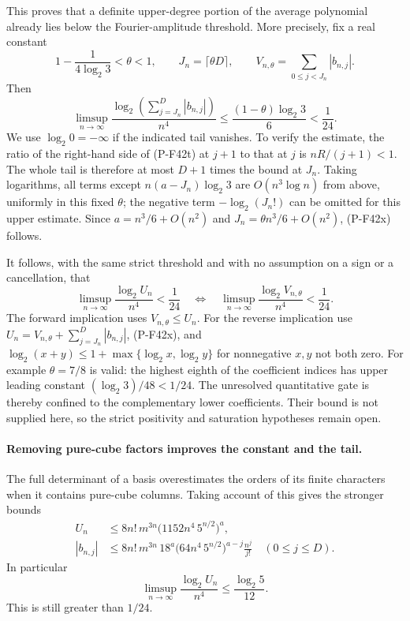This proves that a definite upper-degree portion of the
average polynomial already lies below the Fourier-amplitude
threshold. More precisely, fix a real constant
\[
 1-\frac1{4\log_2 3}<\theta<1,
 \qquad J_n=\lceil\theta D\rceil,
 \qquad V_{n,\theta}=\sum_{0\le j<J_n}|b_{n,j}|.
 \tag{P-F42w}
\]
Then
\[
 \limsup_{n\to\infty}
 \frac{\log_2\left(\sum_{j=J_n}^{D}|b_{n,j}|\right)}{n^4}
 \le \frac{(1-\theta)\log_2 3}{6}<\frac1{24}.
 \tag{P-F42x}
\]
We use \(\log_2 0=-\infty\) if the indicated tail vanishes.
To verify the estimate, the ratio of the right-hand side
of (P-F42t) at \(j+1\) to that at \(j\) is
\(nR/(j+1)<1\).
The whole tail is therefore at most \(D+1\) times
the bound at \(J_n\). Taking logarithms,
all terms except \(n(a-J_n)\log_2 3\) are
\(O(n^3\log n)\) from above, uniformly in this fixed
\(\theta\); the negative term \(-\log_2(J_n!)\)
can be omitted for this upper estimate.
Since \(a=n^3/6+O(n^2)\) and
\(J_n=\theta n^3/6+O(n^2)\), (P-F42x) follows.

It follows, with the same strict threshold and with no
assumption on a sign or a cancellation, that
\[
 \limsup_{n\to\infty}\frac{\log_2 U_n}{n^4}<\frac1{24}
 \quad\Longleftrightarrow\quad
 \limsup_{n\to\infty}
        \frac{\log_2 V_{n,\theta}}{n^4}<\frac1{24}.
 \tag{P-F42y}
\]
The forward implication uses \(V_{n,\theta}\le U_n\).
For the reverse implication use
\(U_n=V_{n,\theta}+\sum_{j=J_n}^D|b_{n,j}|\),
(P-F42x), and
\(\log_2(x+y)\le1+\max\{\log_2x,\log_2y\}\)
for nonnegative \(x,y\) not both zero.
For example \(\theta=7/8\) is valid: the highest eighth
of the coefficient indices has upper leading constant
\((\log_2 3)/48<1/24\). The unresolved quantitative
gate is thereby confined to the complementary lower
coefficients. Their bound is not supplied here, so the
strict positivity and saturation hypotheses remain open.

\paragraph{Removing pure-cube factors improves the constant and the tail.}
The full determinant of a basis overestimates the orders of
its finite characters when it contains pure-cube columns.
Taking account of this gives the stronger bounds
\[
 \begin{split}
 U_n&\le8n!\,m^{3n}
        \bigl(1152n^4\,5^{n/2}\bigr)^a,\\
 |b_{n,j}|&\le8n!\,m^{3n}\,18^a
        \bigl(64n^4\,5^{n/2}\bigr)^{a-j}
                       \frac{n^j}{j!}
                 \quad(0\le j\le D).
 \end{split}
 \tag{P-F42z}
\]
In particular
\[
 \limsup_{n\to\infty}\frac{\log_2 U_n}{n^4}
             \le\frac{\log_2 5}{12}.
 \tag{P-F42aa}
\]
This is still greater than \(1/24\).

